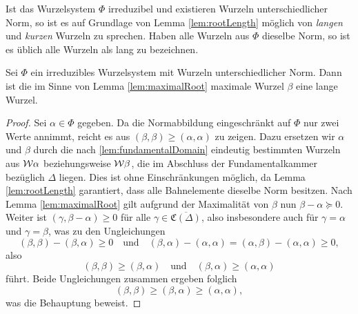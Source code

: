 \begin{bem}
  Ist das Wurzelsystem $\Phi$ irreduzibel und existieren Wurzeln unterschiedlicher Norm, so ist es auf Grundlage von Lemma \ref{lem:rootLength} möglich von \emph{langen} und \emph{kurzen} Wurzeln zu sprechen.
  Haben alle Wurzeln aus $\Phi$ dieselbe Norm, so ist es üblich alle Wurzeln als lang zu bezeichnen.
\end{bem}

\begin{lem}
  Sei $\Phi$ ein irreduzibles Wurzelsystem mit Wurzeln unterschiedlicher Norm.
  Dann ist die im Sinne von Lemma \ref{lem:maximalRoot} maximale Wurzel $\beta$ eine lange Wurzel.
\end{lem}

\begin{proof}
  Sei $\alpha \in \Phi$ gegeben.
  Da die Normabbildung eingeschränkt auf $\Phi$ nur zwei Werte annimmt, reicht es aus $(\beta, \beta) \geq (\alpha, \alpha)$ zu zeigen.
  Dazu ersetzen wir $\alpha$ und $\beta$ durch die nach \ref{lem:fundamentalDomain} eindeutig bestimmten Wurzeln aus $\mathcal{W}\alpha$ beziehungsweise $\mathcal{W}\beta$, die im Abschluss der Fundamentalkammer bezüglich $\Delta$ liegen. 
  Dies ist ohne Einschränkungen möglich, da Lemma \ref{lem:rootLength} garantiert, dass alle Bahnelemente dieselbe Norm besitzen.
  Nach Lemma \ref{lem:maximalRoot} gilt aufgrund der Maximalität von $\beta$ nun $\beta - \alpha \succeq 0$.
  Weiter ist $(\gamma, \beta - \alpha) \geq 0$ für alle $\gamma \in \overline{\mathfrak{C}(\Delta)}$, also insbesondere auch für $\gamma = \alpha$ und $\gamma = \beta$, was zu den Ungleichungen
  \begin{displaymath}
    (\beta, \beta) - (\beta, \alpha) \geq 0 \quad\text{und}\quad 
    (\beta, \alpha) - (\alpha, \alpha) 
    = (\alpha, \beta) - (\alpha, \alpha) \geq 0,
  \end{displaymath}
  also
  \begin{displaymath}
    (\beta, \beta)  \geq (\beta, \alpha) \quad\text{und}\quad 
    (\beta, \alpha) \geq (\alpha, \alpha)
  \end{displaymath}
  führt.
  Beide Ungleichungen zusammen ergeben folglich
  \begin{displaymath}
    (\beta, \beta) \geq (\beta, \alpha) \geq (\alpha, \alpha),
  \end{displaymath}
  was die Behauptung beweist.
\end{proof}
